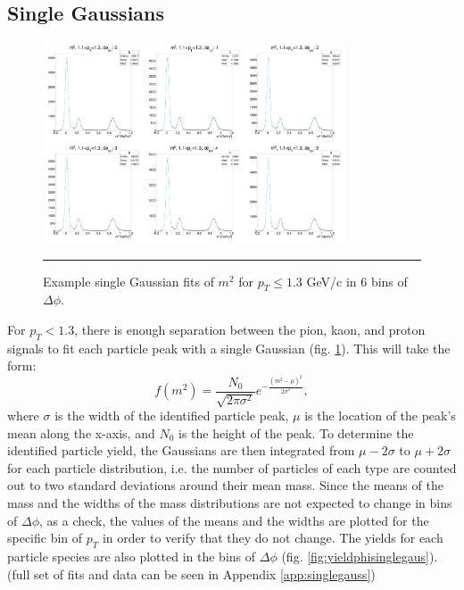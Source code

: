 \subsection{Single Gaussians}
\begin{figure}[htbp!]
  \centering
    \includegraphics[width=0.8\textwidth]{lowptfits/yieldvsdphi_tof1_cent0_ch1_pT-11-13.jpg}
    \rule{35em}{0.5pt}
  \caption[Example single Gaussian fits of $m^2$ for $p_T\leq1.3$ GeV/c in 6 bins of $\Delta \phi$.]{Example single Gaussian fits of $m^2$ for $p_T\leq1.3$ GeV/c in 6 bins of $\Delta \phi$.}
  \label{fig:singlegausm2}
\end{figure}

For $p_T< 1.3$, there is enough separation between the pion, kaon, and proton signals to fit each particle peak with a single Gaussian (fig. \ref{fig:singlegausm2}). This will take the form:
\begin{equation}
f(m^2) = \frac{N_0}{\sqrt{2\pi \sigma^2}} e^{-\frac{(m^2-\mu)^2}{2\sigma^{2}}},
\end{equation}
where $\sigma$ is the width of the identified particle peak, $\mu$ is the location of the peak's mean along the x-axis, and $N_0$ is the height of the peak. To determine the identified particle yield, the Gaussians are then integrated from $\mu-2\sigma$ to $\mu+2\sigma$ for each particle distribution, i.e. the number of particles of each type are counted out to two standard deviations around their mean mass. Since the means of the mass and the widths of the mass distributions are not expected to change in bins of $\Delta \phi$, as a check, the values of the means and the widths are plotted for the specific bin of $p_T$ in order to verify that they do not change. The yields for each particle species are also plotted in the bins of $\Delta \phi$ (fig. \ref{fig:yieldphisinglegaus}). (full set of fits and data can be seen in Appendix \ref{app:singlegauss})

